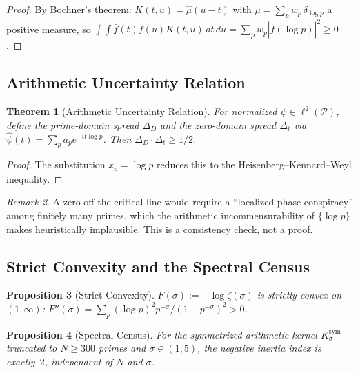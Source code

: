 \documentclass[12pt,a4paper]{article}
\newtheorem{theorem}{Theorem}[section]
\newtheorem{proposition}[theorem]{Proposition}
\theoremstyle{definition}
\theoremstyle{remark}
\newtheorem{remark}[theorem]{Remark}
\newcommand{\Ksym}{K_\sigma^{\mathrm{sym}}}
\newcommand{\PP}{\mathcal{P}}
\begin{document}
\begin{proof}
By Bochner's theorem: $K(t,u) = \hat{\mu}(u-t)$ with $\mu = \sum_p w_p\,\delta_{\log p}$ a positive measure, so $\int\!\!\int \bar{f}(t)f(u)K(t,u)\,dt\,du = \sum_p w_p|\hat{f}(\log p)|^2 \geq 0$.
\end{proof}

\subsection{Arithmetic Uncertainty Relation}

\begin{theorem}[Arithmetic Uncertainty Relation]
\label{thm:uncertainty}
For normalized $\psi \in \ell^2(\PP)$, define the prime-domain spread $\Delta_D$ and the zero-domain spread $\Delta_t$ via $\hat\psi(t) = \sum_p a_p e^{-it\log p}$. Then $\Delta_D \cdot \Delta_t \geq 1/2$.
\end{theorem}

\begin{proof}
The substitution $x_p = \log p$ reduces this to the Heisenberg--Kennard--Weyl inequality.
\end{proof}

\begin{remark}
A zero off the critical line would require a ``localized phase conspiracy'' among finitely many primes, which the arithmetic incommensurability of $\{\log p\}$ makes heuristically implausible. This is a consistency check, not a proof.
\end{remark}

\subsection{Strict Convexity and the Spectral Census}

\begin{proposition}[Strict Convexity]
\label{prop:convexity}
$F(\sigma) := -\log\zeta(\sigma)$ is strictly convex on $(1,\infty)$: $F''(\sigma) = \sum_p (\log p)^2 p^{-\sigma}/(1-p^{-\sigma})^2 > 0$.
\end{proposition}

\begin{proposition}[Spectral Census]
\label{prop:spectral-census}
For the symmetrized arithmetic kernel $\Ksym$ truncated to $N \geq 300$ primes and $\sigma \in (1, 5)$, the negative inertia index is exactly~$2$, independent of $N$ and $\sigma$.
\end{proposition}
\end{document}
